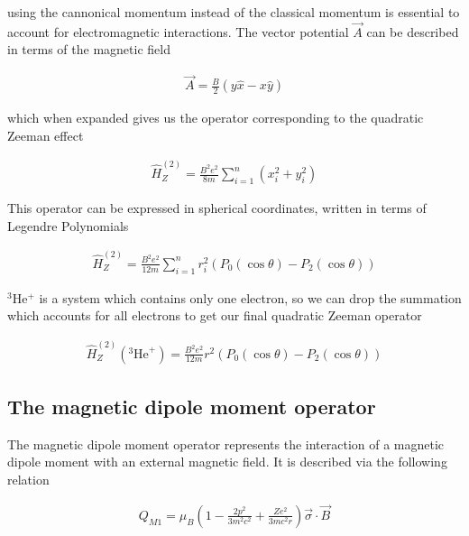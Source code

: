             \noindent using the cannonical momentum instead of the classical momentum is essential to account for electromagnetic interactions. The vector potential $\vec{A}$ can be described in terms of the magnetic field

            \begin{align}
                \vec{A} = \frac{B}{2} \left( y\hat{x} - x\hat{y} \right)
            \end{align}

            \noindent which when expanded gives us the operator corresponding to the quadratic Zeeman effect

            \begin{align}
                \hat{H}_Z^{(2)} = \frac{B^2 e^2}{8m} \sum_{i = 1}^n (x_i^2 + y_i^2)
            \end{align}

            \noindent This operator can be expressed in spherical coordinates, written in terms of Legendre Polynomials

            \begin{align}
                \hat{H}^{(2)}_Z = \frac{B^2 e^2}{12m} \sum_{i = 1}^n r_i^2 \left( P_0(\cos \theta) - P_2(\cos \theta) \right)
            \end{align}

            \noindent $^3$He$^+$ is a system which contains only one electron, so we can drop the summation which accounts for all electrons to get our final quadratic Zeeman operator

            \begin{align}
                \hat{H}^{(2)}_Z(^3\text{He}^+) = \frac{B^2 e^2}{12m} r^2 \left( P_0(\cos \theta) - P_2(\cos \theta) \right)
            \end{align}

        \subsection{The magnetic dipole moment operator}
            The magnetic dipole moment operator represents the interaction of a magnetic dipole moment with an external magnetic field. It is described via the following relation

            \begin{align}
                Q_{M1} = \mu_B \left( 1 - \frac{2p^2}{3m^2 c^2} + \frac{Ze^2}{3mc^2r} \right) \vec{\sigma} \cdot \vec{B}
            \end{align}

